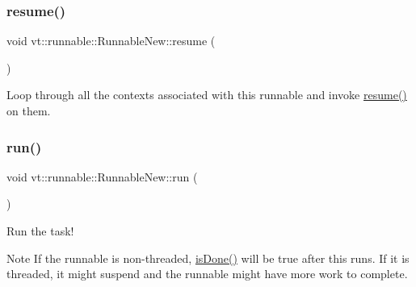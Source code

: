 \mbox{\label{structvt_1_1runnable_1_1_runnable_new_a4d38f8f4d413457a40f134a57480449d}} 
\subsubsection{\texorpdfstring{resume()}{resume()}}
{\footnotesize\ttfamily void vt\+::runnable\+::\+Runnable\+New\+::resume (\begin{DoxyParamCaption}{ }\end{DoxyParamCaption})\hspace{0.3cm}{\ttfamily [private]}}



Loop through all the contexts associated with this runnable and invoke {\ttfamily \hyperlink{structvt_1_1runnable_1_1_runnable_new_a4d38f8f4d413457a40f134a57480449d}{resume()}} on them. 

\mbox{\label{structvt_1_1runnable_1_1_runnable_new_a3fa6c8ee2214c074c748000f782ad793}} 
\subsubsection{\texorpdfstring{run()}{run()}}
{\footnotesize\ttfamily void vt\+::runnable\+::\+Runnable\+New\+::run (\begin{DoxyParamCaption}{ }\end{DoxyParamCaption})}



Run the task! 

\begin{DoxyNote}{Note}
If the runnable is non-\/threaded, {\ttfamily \hyperlink{structvt_1_1runnable_1_1_runnable_new_ad9acf28ef0fed7a7d63a9ca1d3ba3efc}{is\+Done()}} will be {\ttfamily true} after this runs. If it is threaded, it might suspend and the runnable might have more work to complete. 
\end{DoxyNote}
\mbox{\label{structvt_1_1runnable_1_1_runnable_new_aa7e06ec59e7376d1d01dfa6ab9a9563b}} 
